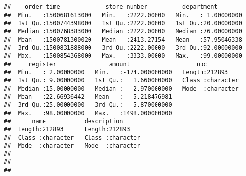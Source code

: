 \documentclass[]{article}
\begin{document}
\begin{verbatim}
##    order_time             store_number          department         
##  Min.   :1500681613000   Min.   :2222.00000   Min.   : 1.00000000  
##  1st Qu.:1500744398000   1st Qu.:2222.00000   1st Qu.:20.00000000  
##  Median :1500768383000   Median :2222.00000   Median :76.00000000  
##  Mean   :1500781300020   Mean   :2413.27154   Mean   :57.95046338  
##  3rd Qu.:1500831888000   3rd Qu.:2222.00000   3rd Qu.:92.00000000  
##  Max.   :1500854368000   Max.   :3333.00000   Max.   :99.00000000  
##     register               amount                   upc           
##  Min.   : 2.00000000   Min.   :-174.000000000   Length:212893     
##  1st Qu.: 9.00000000   1st Qu.:   1.660000000   Class :character  
##  Median :15.00000000   Median :   2.970000000   Mode  :character  
##  Mean   :22.66936442   Mean   :   5.218476981                     
##  3rd Qu.:25.00000000   3rd Qu.:   5.870000000                     
##  Max.   :98.00000000   Max.   :1498.000000000                     
##      name           description       
##  Length:212893      Length:212893     
##  Class :character   Class :character  
##  Mode  :character   Mode  :character  
##                                       
##                                       
## 
\end{verbatim}
\end{document}
